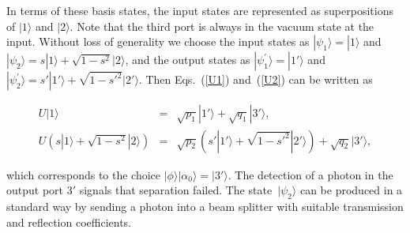 \documentclass[aps,pra,twocolumn,showpacs]{revtex4-1}
\begin{document}
{In terms of these basis states, the input states are represented as superpositions of $|1\rangle$ and $|2\rangle$. Note that the third port is always in the vacuum state at the input. Without loss of generality we choose the input states as $|\psi_{1}\rangle=|1\rangle$ and $|\psi_{2}\rangle = s|1\rangle +\sqrt{1-s^{2}}|2\rangle$, and the output states as  $|\psi_{1}^{\prime}\rangle=|1'\rangle$ and $|\psi_{2}^{\prime}\rangle = s'|1'\rangle +\sqrt{1-s'^{2}}|2'\rangle$. Then  Eqs.~(\ref{U1}) and~(\ref{U2}) can be written as
%
\begin{widetext}
\begin{eqnarray}
U |1\rangle&=&\sqrt{p_1}|1'\rangle+\sqrt{q_1}|3'\rangle,\label{U1 impl}\\[.2em]
U\left( s|1\rangle+\sqrt{1-s^2} |2\rangle\right)&=&\sqrt{p_2}\left( s'|1'\rangle+\sqrt{1-s'^2} |2'\rangle\right)+\sqrt{q_2}|3'\rangle,\label{U2 impl}
\end{eqnarray}
\end{widetext}
%
which corresponds to the choice $|\phi\rangle|\alpha_0\rangle=|3'\rangle$. The detection of a photon in the output port $3'$ signals that separation failed. The state~$|\psi_2\rangle$ can be produced  in a standard way by sending a photon into a beam splitter with suitable transmission and reflection coefficients.


}
\end{document}
